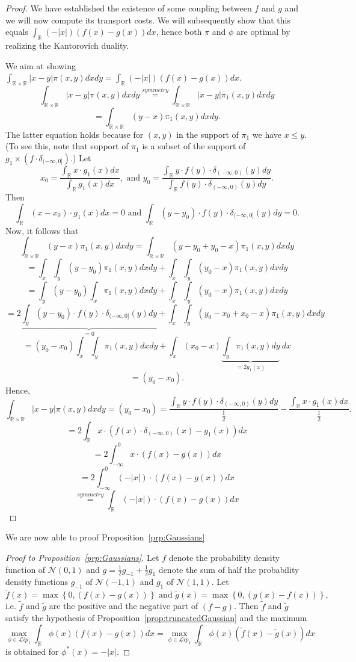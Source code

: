 \documentclass{article} %
\newcommand{\RR}[1][]{\mathbb{R}^{#1}}
\newcommand{\Li}[1]{\mathcal{L}ip_{#1}}
\begin{document}
\begin{proof}
We have established the existence of some coupling between ${f}$ and ${g}$ and we will now compute its transport costs. We will subsequently show that this equals $\int_{\RR}   (-|x|)  ( {f}(x)- {g}(x) ) dx $, hence both $\pi$ and $\phi$ are optimal by realizing the Kantorovich duality.

We aim at showing $\int_{\RR\times\RR} |x-y| \pi(x,y) dx dy= \int_{\RR}   (-|x|)  ( {f}(x)- {g}(x) ) dx$.
$$\int_{\RR\times\RR} |x-y| \pi(x,y) dx dy\stackrel{symmetry}{=} \int_{\RR\times\RR} |x-y| \pi_1(x,y) dxdy$$
$$= \int_{\RR\times\RR} (y-x) \pi_1(x,y) dxdy.$$
The latter equation holds because for $(x,y)$ in the support of $\pi_1$ we have $x\leq y$. (To see this, note that  support of $\pi_1$ is a subset of the support of $ g_1 \times (f\cdot \delta_{(-\infty, 0]})$.) Let
$$x_0=\frac{\int_{\RR}x\cdot {g}_1(x)dx}{\int_{\RR}{g}_1(x)dx},\text{ and } y_0=\frac{\int_{\RR}y\cdot f(y)\cdot \delta_{(-\infty,0)}(y)dy}{\int_{\RR}f(y)\cdot \delta_{(-\infty,0)}(y) dy}.$$
Then
$$\int_{\RR}(x-x_0)\cdot {g}_1(x)dx=0\text{ and }\int_{\RR}(y-y_0)\cdot {f}(y)\cdot \delta_{(-\infty,0]}(y)dy=0.$$
Now, it follows that
$$ \int_{\RR\times\RR} (y-x) \pi_1(x,y) dxdy= \int_{\RR\times\RR} (y-y_0+y_0-x) \pi_1(x,y) dxdy$$
$$=  \int_{x}\int_{y} (y-y_0)\pi_1(x,y) dxdy +   \int_{x}\int_{y}(y_0-x) \pi_1(x,y) dxdy$$
$$=   \int_{y} (y-y_0)\int_{x}\pi_1(x,y) dxdy +   \int_{x}\int_{y}(y_0-x) \pi_1(x,y) dxdy$$
$$ = 2\underbrace{\int_{y} (y-y_0)\cdot f(y)\cdot \delta_{(-\infty,0]}(y) dy}_{=0} +    \int_{x}\int_{y}(y_0-x_0+x_0-x) \pi_1(x,y) dxdy$$
$$= (y_0-x_0)\int_x\int_y\pi_1(x,y)dx dy + \int_x (x_0-x) \underbrace{\int_y  \pi_1(x,y) dy}_{=2g_1(x)}\ dx$$
$$ = (y_0-x_0).$$
Hence,
$$ \int_{\RR\times\RR} |x-y| \pi(x,y) dx dy= (y_0-x_0)=\frac{ \int_{\RR}y\cdot f(y)\cdot \delta_{(-\infty,0)}(y)dy}{\frac{1}{2}} - \frac{ \int_{\RR}x\cdot {g}_1(x)dx}{\frac{1}{2}} .$$
$$=2\int_{\RR}x\cdot (f(x)\cdot \delta_{(-\infty,0)}(x)-{g}_1(x) )dx$$
$$= 2 \int_{-\infty}^0 x\cdot  ( {f}(x)- {g}(x) ) dx$$
$$= 2 \int_{-\infty}^0 (-|x|)\cdot  ( {f}(x)- {g}(x) ) dx$$
$$ \stackrel{symmetry}{=}\int_{\RR} (-|x|)\cdot  ( {f}(x)- {g}(x) ) dx$$
\end{proof}

We are now able to proof Proposition~\ref{prp:Gaussians}

\begin{proof}[Proof to Proposition~\ref{prp:Gaussians}]\label{prf:Gaussians}
Let $f$ denote the probability density function of $\mathcal{N}(0,1)$ and $g=\frac{1}{2}g_{-1}+\frac{1}{2}g_{1}$ denote the sum of half the probability density functions $g_{-1}$ of $\mathcal{N}(-1,1)$ and $g_{1}$ of $\mathcal{N}(1,1)$. Let $$\tilde{f}(x)=\max \left \{0, (f(x)-g(x))\right \} \text{ and } \tilde{g}(x)=\max \left \{0, (g(x)-f(x))\right \}, $$
i.e. $\tilde{f}$ and $\tilde{g}$ are the positive and the negative part of $(f-g)$.
Then $\tilde{f}$ and $\tilde{g}$ satisfy the hypothesis of Proposition~\ref{prop:truncatedGaussian} and the maximum $$\max_{\phi\in \Li{1}} \int_{\RR}   \phi(x) ({f}(x)- {g}(x) ) dx =\max_{\phi\in \Li{1}} \int_{\RR}   \phi(x) ( \tilde{f}(x)- \tilde{g}(x) ) dx $$ is obtained for $\phi^*(x)=-|x|$.
\end{proof}
\end{document}
